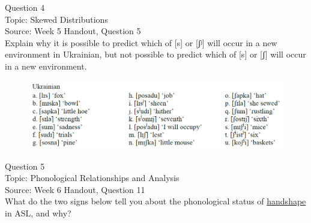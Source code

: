 \documentclass[12pt]{article}
\begin{document}
\newpage

{\large Question 4}\\

Topic: Skewed Distributions\\
Source: Week 5 Handout, Question 5\\

Explain why it is possible to predict which of [s] or [ʃʲ] will occur in a new environment in Ukrainian, but not possible to predict which of [s] or [ʃ] will occur in a new environment.\\

\begin{figure}[H]
\includegraphics{../images/ukrainian.png}
\end{figure}

\newpage

{\large Question 5}\\

Topic: Phonological Relationships and Analysis\\
Source: Week 6 Handout, Question 11\\

What do the two signs below tell you about the phonological status of \underline{handshape} in ASL, and why?\\
\end{document}
